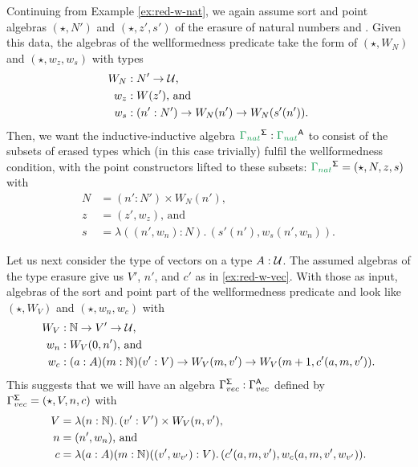 \begin{defn}
\begin{example}\label{ex:red-init-nat}
Continuing from Example \ref{ex:red-w-nat}, we again assume %
sort and point algebras $(\star, N')$ and $(\star, z', s')$ of the erasure of
natural numbers  and .
Given this data,
the algebras of the wellformedness predicate take the form of
$(\star, W_N)$ and $(\star, w_z, w_s)$ with types
\begin{align*}
W_N &: N' \to \mathcal{U} \text{,} \\
w_z &: W(z') \text{, and} \\
w_s &: (n' : N') \to W_N(n') \to W_N(s'(n')) \text{.}
\end{align*}
Then, we want the inductive-inductive algebra
$\grm{\Gamma_{nat}}^\Sg : \grm{\Gamma_{nat}}^\CC$ to consist of the subsets of
erased types which (in this case trivially) fulfil the wellformedness condition,
with the point constructors lifted to these subsets:
$\grm{\Gamma_{nat}}^\Sg = (\star, N, z, s)$ with
\begin{align*}
N &= (n' : N') \times W_N(n') \text{,} \\
z &= (z', w_z) \text{, and} \\
s &= \lambda ((n', w_n) : N).\, (s'(n'), w_s(n', w_n)) \text{.}
\end{align*}
\end{example}

\begin{example}[Vectors]
Let us next consider the type of vectors on a type $A : \mathcal{U}$.
The assumed algebras of the type erasure give us $V'$, $n'$, and $c'$ as in
\ref{ex:red-w-vec}.
With those as input, algebras of the sort and point part of the 
wellformedness predicate  and
 look like
$(\star, W_V)$ and $(\star, w_n, w_c)$ with
\begin{align*}
W_V &: \mathbb{N} \to V' \to \mathcal{U} \text{,} \\
w_n &: W_V(0, n') \text{, and} \\
w_c &: (a : A)(m : \mathbb{N})(v' : V) \to W_V(m, v') \to W_V(m + 1, c'(a, m, v')) \text{.}
\end{align*}
This suggests that we will have an algebra $\Gamma_{vec}^{\mathsf{\Sigma}} : \Gamma_{vec}^{\mathsf{A}}$
defined by $\Gamma_{vec}^{\mathsf{\Sigma}} = (\star, V, n, c)$ with
\begin{align*}
V &= \lambda (n : \mathbb{N}).\, (v' : V') \times W_V(n, v') \text{,} \\
n &= (n', w_n) \text{, and} \\
c &= \lambda (a : A)(m : \mathbb{N})((v', w_{v'}) : V).\, (c'(a, m, v'), w_c(a, m, v', w_{v'})) \text{.}
\end{align*}
\end{example}


\end{defn}
